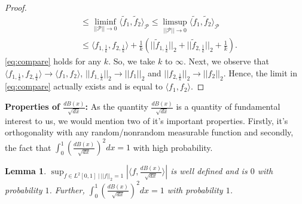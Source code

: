 \documentclass[reqno,12pt]{amsart}
\theoremstyle{plain}
\newtheorem{lemma}{Lemma}
\theoremstyle{definition}
\let\tilde\widetilde
\begin{document}
\begin{proof}
\begin{equation}
\begin{split}
     &\le \liminf_{||\mathcal{P}|| \to 0} \langle \tilde{f}_{1}, \tilde{f}_{2} \rangle_{\mathcal{P}} \le \limsup_{||\mathcal{P}|| \to 0} \langle \tilde{f}_{1}, \tilde{f}_{2} \rangle_{\mathcal{P}}\\
     &\le   \langle {f}_{1,\frac{1}{k}}, {f}_{2, \frac{1}{k}} \rangle + \frac{1}{k}\left( ||\tilde{f}_{1, \frac{1}{k}}||_{2} +  ||\tilde{f}_{2, \frac{1}{k}}||_{2} + \frac{1}{k}\right). 
        \end{split}
    \end{equation}
  \eqref{eq:compare} holds for any $k$. So, we take $k$ to $\infty$. Next, we observe that $ \langle f_{1,\frac{1}{k}} , f_{2,\frac{1}{k}}\rangle \to \langle f_{1}, f_{2} \rangle$, $||f_{1,\frac{1}{k}}||_{2} \to ||f_{1}||_{2}$ and $||f_{2, \frac{1}{k}}||_{2} \to ||f_{2}||_{2}$. Hence, the limit in \eqref{eq:compare} actually exists and is equal to $\langle f_{1}, f_{2} \rangle $.  
\end{proof}
\noindent 
\textbf{Properties of $\frac{dB(x)}{\sqrt{dx}}$:}
As the quantity $\frac{dB(x)}{\sqrt{dx}}$ is a quantity of fundamental interest to us, we would mention two of it's important properties. Firstly, it's orthogonality with any random/nonrandom measurable function and secondly, the fact that $\int_{0}^{1} \left( \frac{dB(x)}{\sqrt{dx}} \right)^{2} dx =1$ with high probability. 
\begin{lemma}
 $\sup_{f \in L^{2}[0,1] ~|~ ||f||_{2}=1}\left|\langle f, \frac{dB(x)}{\sqrt{dx}} \rangle\right|$ is well defined and is $0$ with probability $1$. Further, $\int_{0}^{1} \left( \frac{dB(x)}{\sqrt{dx}} \right)^{2} dx=1$ with probability $1$.
\end{lemma}
\end{document}
